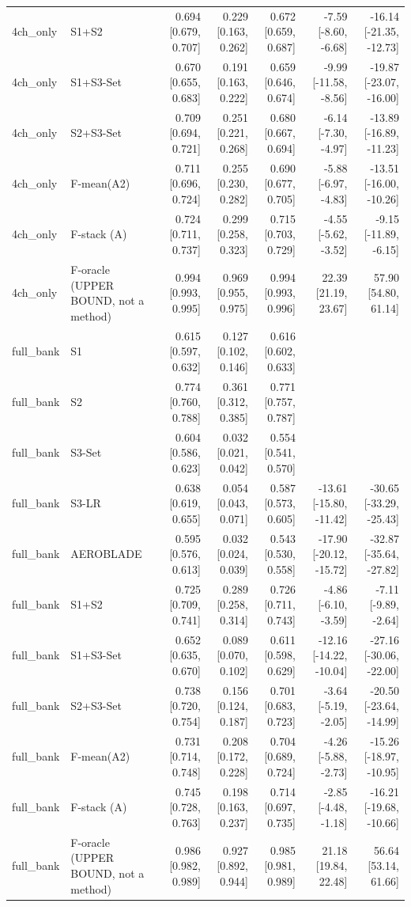 \begin{table}[htbp]
\begin{tabular}{llrrrrr}
4ch\_only & S1+S2 & 0.694 [0.679, 0.707] & 0.229 [0.163, 0.262] & 0.672 [0.659, 0.687] & -7.59 [-8.60, -6.68] & -16.14 [-21.35, -12.73] \\
4ch\_only & S1+S3-Set & 0.670 [0.655, 0.683] & 0.191 [0.163, 0.222] & 0.659 [0.646, 0.674] & -9.99 [-11.58, -8.56] & -19.87 [-23.07, -16.00] \\
4ch\_only & S2+S3-Set & 0.709 [0.694, 0.721] & 0.251 [0.221, 0.268] & 0.680 [0.667, 0.694] & -6.14 [-7.30, -4.97] & -13.89 [-16.89, -11.23] \\
4ch\_only & F-mean(A2) & 0.711 [0.696, 0.724] & 0.255 [0.230, 0.282] & 0.690 [0.677, 0.705] & -5.88 [-6.97, -4.83] & -13.51 [-16.00, -10.26] \\
4ch\_only & F-stack (A) & 0.724 [0.711, 0.737] & 0.299 [0.258, 0.323] & 0.715 [0.703, 0.729] & -4.55 [-5.62, -3.52] & -9.15 [-11.89, -6.15] \\
4ch\_only & F-oracle (UPPER BOUND, not a method) & 0.994 [0.993, 0.995] & 0.969 [0.955, 0.975] & 0.994 [0.993, 0.996] & 22.39 [21.19, 23.67] & 57.90 [54.80, 61.14] \\
full\_bank & S1 & 0.615 [0.597, 0.632] & 0.127 [0.102, 0.146] & 0.616 [0.602, 0.633] &  &  \\
full\_bank & S2 & 0.774 [0.760, 0.788] & 0.361 [0.312, 0.385] & 0.771 [0.757, 0.787] &  &  \\
full\_bank & S3-Set & 0.604 [0.586, 0.623] & 0.032 [0.021, 0.042] & 0.554 [0.541, 0.570] &  &  \\
full\_bank & S3-LR & 0.638 [0.619, 0.655] & 0.054 [0.043, 0.071] & 0.587 [0.573, 0.605] & -13.61 [-15.80, -11.42] & -30.65 [-33.29, -25.43] \\
full\_bank & AEROBLADE & 0.595 [0.576, 0.613] & 0.032 [0.024, 0.039] & 0.543 [0.530, 0.558] & -17.90 [-20.12, -15.72] & -32.87 [-35.64, -27.82] \\
full\_bank & S1+S2 & 0.725 [0.709, 0.741] & 0.289 [0.258, 0.314] & 0.726 [0.711, 0.743] & -4.86 [-6.10, -3.59] & -7.11 [-9.89, -2.64] \\
full\_bank & S1+S3-Set & 0.652 [0.635, 0.670] & 0.089 [0.070, 0.102] & 0.611 [0.598, 0.629] & -12.16 [-14.22, -10.04] & -27.16 [-30.06, -22.00] \\
full\_bank & S2+S3-Set & 0.738 [0.720, 0.754] & 0.156 [0.124, 0.187] & 0.701 [0.683, 0.723] & -3.64 [-5.19, -2.05] & -20.50 [-23.64, -14.99] \\
full\_bank & F-mean(A2) & 0.731 [0.714, 0.748] & 0.208 [0.172, 0.228] & 0.704 [0.689, 0.724] & -4.26 [-5.88, -2.73] & -15.26 [-18.97, -10.95] \\
full\_bank & F-stack (A) & 0.745 [0.728, 0.763] & 0.198 [0.163, 0.237] & 0.714 [0.697, 0.735] & -2.85 [-4.48, -1.18] & -16.21 [-19.68, -10.66] \\
full\_bank & F-oracle (UPPER BOUND, not a method) & 0.986 [0.982, 0.989] & 0.927 [0.892, 0.944] & 0.985 [0.981, 0.989] & 21.18 [19.84, 22.48] & 56.64 [53.14, 61.66] \\
\bottomrule
\end{tabular}
\end{table}
